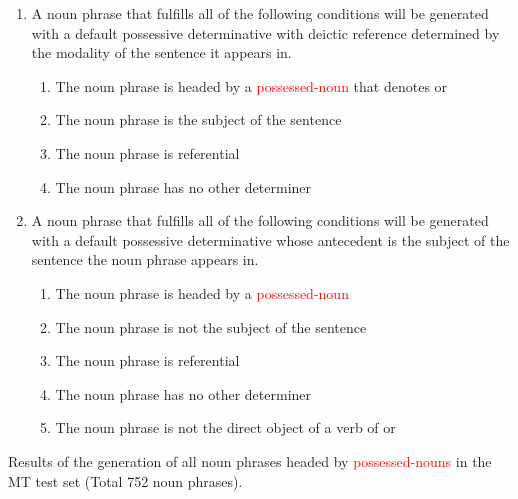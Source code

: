 \documentclass[a4paper,landscape,headrule,footrule,xetex]{foils}
\newcommand{\trg}[1]{\textcolor{red}{#1}}
\begin{document}
{\small
     \begin{enumerate} %
     \item A noun phrase that fulfills all of the following conditions
       will be generated with a default possessive determinative with
       deictic reference determined by the modality of the sentence it
       appears in.
        \begin{enumerate}
        \item The noun phrase is headed by a \trg{possessed-noun} that
          denotes  or 
        \item The noun phrase is the subject of the sentence
        \item The noun phrase is referential
        \item The noun phrase has no other determiner
        \end{enumerate}
      \item A noun phrase that fulfills all of the following
        conditions will be generated with a default possessive
        determinative whose antecedent is the subject of the sentence
        the noun phrase appears in.
        \begin{enumerate}
        \item The noun phrase is headed by a \trg{possessed-noun} 
        \item The noun phrase is not the subject of the sentence
        \item The noun phrase is referential
        \item The noun phrase has no other determiner
        \item The noun phrase is not the direct object of a verb of
           or 
        \end{enumerate}
      \end{enumerate}
}


Results of the generation of all noun phrases headed by
\trg{possessed-nouns} in the MT test set (Total 752 noun phrases).
\end{document}
